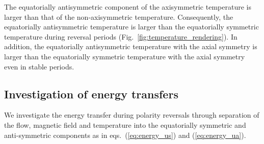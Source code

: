 The equatorially antisymmetric component of the axisymmetric temperature is larger than that of the non-axisymmetric temperature.%
Consequently, the equatorially antisymmetric  temperature is larger than the equatorially symmetric temperature during reversal periods (Fig.~\ref{fig:temperature_rendering}). 
{\color{red}
In addition, the equatorially antisymmetric temperature with the axial symmetry is larger than the equatorially symmetric temperature with the axial symmetry even in stable periods.
}



\subsection{Investigation of energy transfers}
\label{sec:energy_transfer}

{\color{red}
We investigate the energy transfer during polarity reversals through separation of the flow, magnetic field and temperature into the equatorially symmetric and anti-symmetric components as in eqs.~(\ref{eq:energy_us}) and (\ref{eq:energy_ua}).
}

